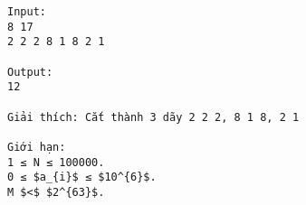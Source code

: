 \begin{verbatim}
Input:
8 17
2 2 2 8 1 8 2 1

Output:
12

Giải thích: Cắt thành 3 dãy 2 2 2, 8 1 8, 2 1

Giới hạn:
1 ≤ N ≤ 100000.
0 ≤ $a_{i}$ ≤ $10^{6}$.
M $<$ $2^{63}$.

\end{verbatim}